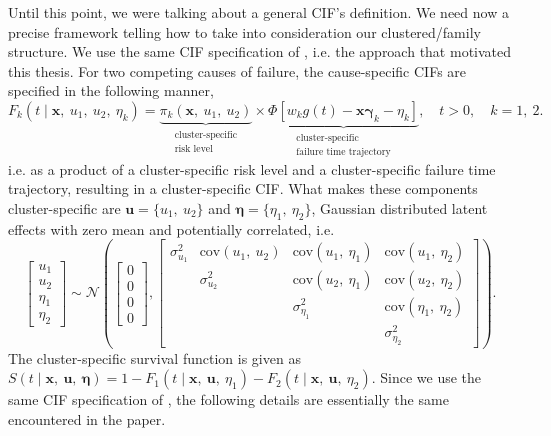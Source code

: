 Until this point, we were talking about a general CIF's definition. We
need now a precise framework telling how to take into consideration our
clustered/family structure. We use the same CIF specification of
, i.e. the approach that motivated this thesis. For
two competing causes of failure, the cause-specific CIFs are specified
in the following manner,
\begin{equation}
  F_{k} (t \mid \bm{x},~u_{1},~u_{2},~\eta_{k}) =
  \underbrace{\pi_{k}(\bm{x},~u_{1},~u_{2})}_{
    \substack{\text{cluster-specific}\\\text{risk level}}}\times
  \underbrace{\Phi[w_{k} g(t) - \bm{x}\bm{\gamma}_{k} - \eta_{k}]}_{
    \substack{\text{cluster-specific}\\\text{failure time trajectory}}
  }, \quad t > 0, \quad k = 1,~2.
  \label{eq:cif}
\end{equation}
i.e. as a product of a cluster-specific risk level and a
cluster-specific failure time trajectory, resulting in a
cluster-specific CIF. What makes these components cluster-specific are
\(\bm{u} = \{u_{1},~u_{2}\}\) and \(\bm{\eta} =
\{\eta_{1},~\eta_{2}\}\), Gaussian distributed latent effects with zero
mean and potentially correlated, i.e.
\[
  \begin{bmatrix} u_{1}\\u_{2}\\\eta_{1}\\\eta_{2} \end{bmatrix} \sim
  \mathcal{N} \left(\begin{bmatrix} 0\\0\\0\\0\end{bmatrix},
    \begin{bmatrix}
      \sigma_{u_{1}}^{2}&
      \text{cov}(u_{1},~u_{2})&
      \text{cov}(u_{1},~\eta_{1})&\text{cov}(u_{1},~\eta_{2})\\
      &\sigma_{u_{2}}^{2}&
      \text{cov}(u_{2},~\eta_{1})&\text{cov}(u_{2},~\eta_{2})\\
      &&\sigma_{\eta_{1}}^{2}&\text{cov}(\eta_{1},~\eta_{2})\\
      &&&\sigma_{\eta_{2}}^{2}
    \end{bmatrix}\right).
\]
The cluster-specific survival function is given as \(S(t \mid
\bm{x},~\bm{u},~\bm{\eta}) = 1 - F_{1} (t \mid
\bm{x},~\bm{u},~\eta_{1}) - F_{2} (t \mid
\bm{x},~\bm{u},~\eta_{2})\). Since we use the same CIF specification
of , the following details are essentially the same
encountered in the paper.


